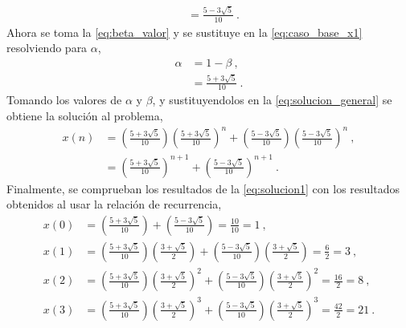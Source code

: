 \begin{solution}
\begin{align}
        & = \frac{5 - 3 \sqrt{5}}{10}\ . \label{eq:beta_valor}
    \end{align}
    Ahora se toma la \cref{eq:beta_valor} y se sustituye en la \cref{eq:caso_base_x1} resolviendo para $\alpha$,
    \begin{align*}
        \alpha & = 1 - \beta\ , \nonumber \\
        & = \frac{5 + 3 \sqrt{5}}{10}\ .
    \end{align*}
    Tomando los valores de $\alpha$ y $\beta$, y sustituyendolos en la \cref{eq:solucion_general} se obtiene la solución al problema,
    \begin{align}
        x(n) & = \left(\frac{5 + 3 \sqrt{5}}{10}\right) \left(\frac{5 + 3 \sqrt{5}}{10}\right)^n + \left(\frac{5 - 3 \sqrt{5}}{10}\right) \left(\frac{5 - 3 \sqrt{5}}{10}\right)^n\ , \nonumber \\
        & = \left(\frac{5 + 3 \sqrt{5}}{10}\right)^{n+1} + \left(\frac{5 - 3 \sqrt{5}}{10}\right)^{n+1}\ . \label{eq:solucion1}
    \end{align}
    Finalmente, se comprueban los resultados de la \cref{eq:solucion1} con los resultados obtenidos al usar la relación de recurrencia,
    \begin{align*}
        x(0) & = \left(\frac{5 + 3 \sqrt{5}}{10}\right) + \left(\frac{5 - 3 \sqrt{5}}{10}\right) = \frac{10}{10} = 1\ , \\
        x(1) & = \left(\frac{5 + 3 \sqrt{5}}{10}\right) \left(\frac{3 + \sqrt{5}}{2}\right) + \left(\frac{5 - 3 \sqrt{5}}{10}\right) \left(\frac{3 + \sqrt{5}}{2}\right) = \frac{6}{2} = 3\ , \\
        x(2) & = \left(\frac{5 + 3 \sqrt{5}}{10}\right) \left(\frac{3 + \sqrt{5}}{2}\right)^2 + \left(\frac{5 - 3 \sqrt{5}}{10}\right) \left(\frac{3 + \sqrt{5}}{2}\right)^2 = \frac{16}{2} = 8\ , \\
        x(3) & = \left(\frac{5 + 3 \sqrt{5}}{10}\right) \left(\frac{3 + \sqrt{5}}{2}\right)^3 + \left(\frac{5 - 3 \sqrt{5}}{10}\right) \left(\frac{3 + \sqrt{5}}{2}\right)^3 = \frac{42}{2} = 21\ .
    \end{align*}
\end{solution}


